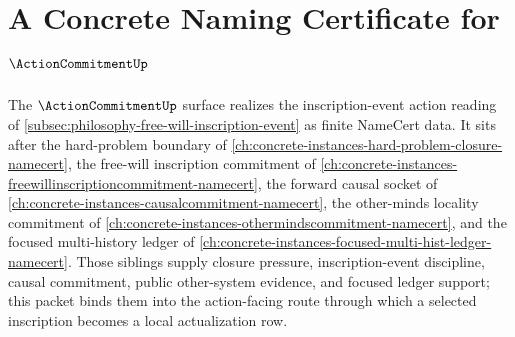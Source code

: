 \chapter{A Concrete Naming Certificate for $\ActionCommitmentUp$}
\label{ch:concrete-instances-actioncommitment-namecert}

The $\ActionCommitmentUp$ surface realizes the inscription-event action reading of \autoref{subsec:philosophy-free-will-inscription-event} as finite NameCert data. It sits after the hard-problem boundary of \autoref{ch:concrete-instances-hard-problem-closure-namecert}, the free-will inscription commitment of \autoref{ch:concrete-instances-freewillinscriptioncommitment-namecert}, the forward causal socket of \autoref{ch:concrete-instances-causalcommitment-namecert}, the other-minds locality commitment of \autoref{ch:concrete-instances-othermindscommitment-namecert}, and the focused multi-history ledger of \autoref{ch:concrete-instances-focused-multi-hist-ledger-namecert}. Those siblings supply closure pressure, inscription-event discipline, causal commitment, public other-system evidence, and focused ledger support; this packet binds them into the action-facing route through which a selected inscription becomes a local actualization row.

